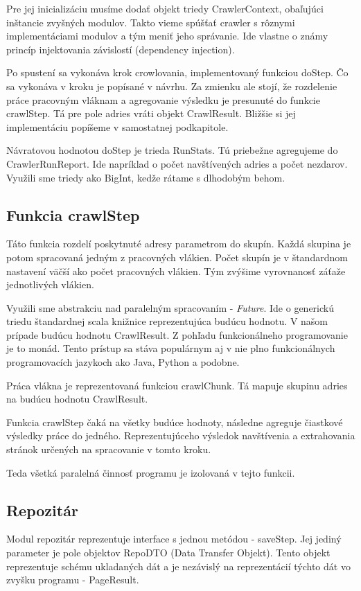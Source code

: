 Pre jej inicializáciu musíme dodať objekt triedy CrawlerContext, obaľujúci inštancie zvyšných modulov. Takto vieme spúšťať crawler s rôznymi implementáciami modulov a tým meniť jeho správanie. Ide vlastne o známy princíp injektovania závislostí (dependency injection). 

Po spustení sa vykonáva krok crowlovania, implementovaný funkciou doStep. Čo sa vykonáva v kroku je popísané v návrhu. Za zmienku ale stojí, že rozdelenie práce pracovným vláknam a agregovanie výsledku je presunuté do funkcie crawlStep. Tá pre pole adries vráti objekt CrawlResult. Bližšie si jej implementáciu popíšeme v samostatnej podkapitole. 

Návratovou hodnotou doStep je trieda RunStats. Tú priebežne agregujeme do CrawlerRunReport. Ide napríklad o počet navštívených adries a počet nezdarov. Využili sme triedy ako BigInt, kedže rátame s dlhodobým behom. 

\subsection{Funkcia crawlStep}
Táto funkcia rozdelí poskytnuté adresy parametrom do skupín. Každá skupina je potom spracovaná jedným z pracovných vlákien. Počet skupín je v štandardnom nastavení väčší ako počet pracovných vlákien. Tým zvýšime vyrovnanosť záťaže jednotlivých vlákien.

Využili sme abstrakciu nad paralelným spracovaním - \textit{Future}. Ide o generickú triedu štandardnej scala knižnice reprezentujúca budúcu hodnotu. V našom prípade budúcu hodnotu CrawlResult. Z pohľadu funkcionálneho programovanie je to monád. Tento prístup sa stáva populárnym aj v nie plno funkcionálnych programovacích jazykoch ako Java, Python a podobne. 

Práca vlákna je reprezentovaná funkciou crawlChunk. Tá mapuje skupinu adries na budúcu hodnotu CrawlResult. 

Funkcia crawlStep čaká na všetky budúce hodnoty, následne agreguje čiastkové výsledky práce do jedného. Reprezentujúceho výsledok navštívenia a extrahovania stránok určených na spracovanie v tomto kroku. 

Teda všetká paralelná činnosť programu je izolovaná v tejto funkcii. 

\subsection{Repozitár}
Modul repozitár reprezentuje interface s jednou metódou - saveStep. Jej jediný parameter je pole objektov RepoDTO (Data Transfer Objekt). Tento objekt reprezentuje schému ukladaných dát a je nezávislý na reprezentácií týchto dát vo zvyšku programu - PageResult. 

